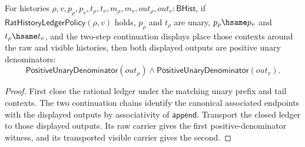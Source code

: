 \begin{theorem}
\label{thm:rat-history-ledger-policy-cont-unary-context-positive-denominators}
For histories $\rho,v,p_\rho,p_v,t_\rho,t_v,m_\rho,m_v,out_\rho,out_v:\mathsf{BHist}$, if
$\mathsf{RatHistoryLedgerPolicy}(\rho,v)$ holds, $p_\rho$ and $t_\rho$ are
unary, $p_\rho\hsame p_v$ and $t_\rho\hsame t_v$, and the two-step continuation
displays place those contexts around the raw and visible histories, then both
displayed outputs are positive unary denominators:
$$
\mathsf{PositiveUnaryDenominator}(out_\rho)\land
\mathsf{PositiveUnaryDenominator}(out_v).
$$
\end{theorem}
\begin{proof}
First close the rational ledger under the matching unary prefix and tail
contexts. The two continuation chains identify the canonical associated
endpoints with the displayed outputs by associativity of $\mathsf{append}$.
Transport the closed ledger to those displayed outputs. Its raw carrier gives
the first positive-denominator witness, and its transported visible carrier
gives the second.
\end{proof}

